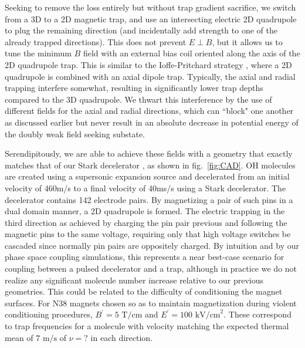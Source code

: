 \documentclass[%
 reprint,
 amsmath,amssymb,
 aps,
prl,
]{revtex4-1}
\begin{document}
Seeking to remove the loss entirely but without trap gradient sacrifice, we switch from a 3D to a 2D magnetic trap, and use an intersecting electric 2D quadrupole to plug the remaining direction (and incidentally add strength to one of the already trapped directions). This does not prevent $E\!\perp\! B$, but it allows us to tune the minimum $B$ field with an external bias coil oriented along the axis of the 2D quadrupole trap. This is similar to the Ioffe-Pritchard strategy \cite{ref:iptrap}, where a 2D quadrupole is combined with an axial dipole trap. Typically, the axial and radial trapping interfere somewhat, resulting in significantly lower trap depths compared to the 3D quadrupole. We thwart this interference by the use of different fields for the axial and radial directions, which can ``block" one another as discussed earlier but never result in an absolute decrease in potential energy of the doubly weak field seeking substate. 

Serendipitously, we are able to achieve these fields with a geometry that exactly matches that of our Stark decelerator \cite{Bochinski2003}, as shown in fig.~\ref{fig:CAD}. OH molecules are created using a supersonic expansion source and decelerated from an initial velocity of 460m/s to a final velocity of 40ms/s using a Stark decelerator. The decelerator contains 142 electrode pairs. By magnetizing a pair of such pins in a dual domain manner, a 2D quadrupole is formed. The electric trapping in the third direction as achieved by charging the pin pair previous and following the magnetic pins to the same voltage, requiring only that high voltage switches be cascaded since normally pin pairs are oppositely charged. By intuition and by our phase space coupling simulations, this represents a near best-case scenario for coupling between a pulsed decelerator and a trap, although in practice we do not realize any significant molecule number increase relative to our previous geometries. This could be related to the difficulty of conditioning the magnet surfaces. For N38 magnets chosen so as to maintain magnetization during violent conditioning procedures, $B^\prime=5\text{ T/cm}$ and $E^\prime=100 \text{ kV/cm}^2$. These correspond to trap frequencies for a molecule with velocity matching the expected thermal mean of $7 \text{ m/s}$ of $\nu=?$ in each direction.
\end{document}
